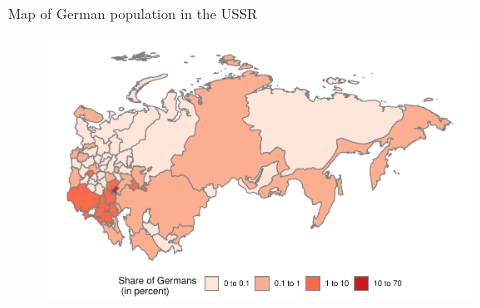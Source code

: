 \documentclass[11pt]{beamer}
\begin{document}
\begin{frame}[label=map_share]{Map of German population in the USSR}
 \begin{figure}[h]
\centering
\includegraphics[width=1\textwidth]{map_share_of_germans_discrete.pdf}
\end{figure}
\hyperlink{add_content}{}
\end{frame}
\end{document}
